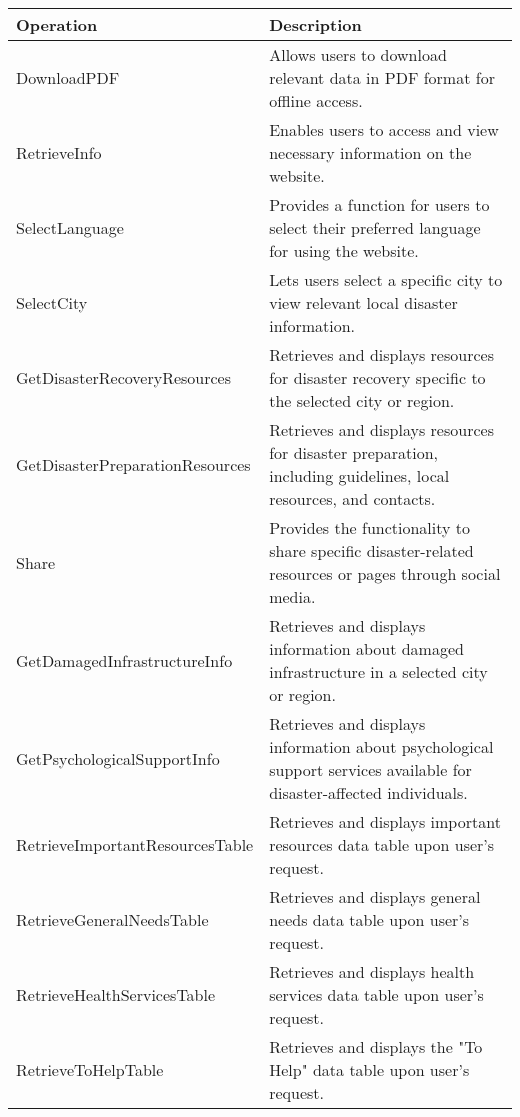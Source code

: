 \documentclass[12pt, letterpaper]{article}
\begin{document}
\begin{table}[H]
    \centering
    \begin{tabular}{|l|p{10cm}|}
        \hline
        \textbf{Operation} & \textbf{Description} \\
        \hline %
        DownloadPDF & Allows users to download relevant data in PDF format for offline access. \\
        \hline %
        RetrieveInfo & Enables users to access and view necessary information on the website. \\
        \hline %
        SelectLanguage & Provides a function for users to select their preferred language for using the website. \\
        \hline %
        SelectCity & Lets users select a specific city to view relevant local disaster information. \\
        \hline %
        GetDisasterRecoveryResources & Retrieves and displays resources for disaster recovery specific to the selected city or region. \\
        \hline
        GetDisasterPreparationResources & Retrieves and displays resources for disaster preparation, including guidelines, local resources, and contacts. \\
        \hline
        Share & Provides the functionality to share specific disaster-related resources or pages through social media. \\
        \hline
        GetDamagedInfrastructureInfo & Retrieves and displays information about damaged infrastructure in a selected city or region. \\
        \hline
        GetPsychologicalSupportInfo & Retrieves and displays information about psychological support services available for disaster-affected individuals. \\
        \hline
        RetrieveImportantResourcesTable & Retrieves and displays important resources data table upon user's request. \\
        \hline %
        RetrieveGeneralNeedsTable & Retrieves and displays general needs data table upon user's request. \\
        \hline %
        RetrieveHealthServicesTable & Retrieves and displays health services data table upon user's request. \\
        \hline %
        RetrieveToHelpTable & Retrieves and displays the "To Help" data table upon user's request. \\

\end{tabular}
\end{table}
\end{document}
